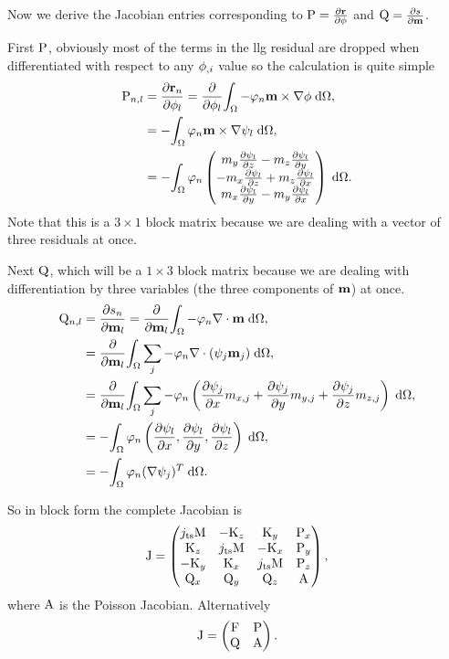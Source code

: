 Now we derive the Jacobian entries corresponding to $\Pm = \pd{\rllg}{\phim}$ and $\Qm = \pd{\rphi}{\mv}$.

First $\Pm$, obviously most of the terms in the llg residual are dropped when differentiated with respect to any $\phim_{,i}$ value so the calculation is quite simple
\begin{equation}
  \begin{aligned}
    \Pm_{n,l} &= \pd{\rllg_n}{\phim_l} 
    = \pd{}{\phim_l} \intd{ -\tbf_n \mv \times \grad \phim}, \\
    &= -\intd{ \tbf_n \mv \times \grad \sbf_l}, \\
    &= -\intd{ \tbf_n \threevec{m_y\pd{\sbf_l}{z} - m_z \pd{\sbf_l}{y}}
      {-m_x\pd{\sbf_l}{z} + m_z \pd{\sbf_l}{x}}
      {m_x\pd{\sbf_l}{y} - m_y \pd{\sbf_l}{x}}}.
  \end{aligned}
\end{equation}
Note that this is a $3 \times 1$ block matrix because we are dealing with a vector of three residuals at once.

Next $\Qm$, which will be a $1 \times 3$ block matrix because we are dealing with differentiation by three variables (the three components of $\mv$) at once.
\begin{equation}
  \begin{aligned}
    \Qm_{n,l} &= \pd{\rphi_n}{\mv_l} = \pd{}{\mv_l} \intd{ -\tbf_n \div \mv}, \\
    &= \pd{}{\mv_l} \intd{ \sum_j -\tbf_n \div (\sbf_j \mv_j)}, \\
    &= \pd{}{\mv_l} \intd{ \sum_j -\tbf_n \left( \pd{\sbf_j}{x} m_{x,j} 
        + \pd{\sbf_j}{y} m_{y,j} + \pd{\sbf_j}{z} m_{z,j} \right) }, \\
    &= -\intd{ \tbf_n \left( \pd{\sbf_l}{x}, 
        \pd{\sbf_l}{y}, \pd{\sbf_l}{z} \right) }, \\
    &= -\intd{\tbf_n (\grad \sbf_j)^T}.
  \end{aligned}
\end{equation}

So in block form the complete Jacobian is
\begin{equation}
  \Jm =
  \begin{pmatrix}
    \jts \Mm    & -\Km_z       & \Km_y      & \Pm_x \\
    \Km_z         & \jts\Mm    & -\Km_x     & \Pm_y \\
    -\Km_y        & \Km_x      & \jts \Mm & \Pm_z \\
    \Qm_x       & \Qm_y      & \Qm_z    & \Am     \\
  \end{pmatrix},
\end{equation}
where $\Am$ is the Poisson Jacobian.
Alternatively
\begin{equation}
\Jm =
  \begin{pmatrix}
    \Fm   & \Pm \\
    \Qm   & \Am \\
  \end{pmatrix}.
\end{equation}





